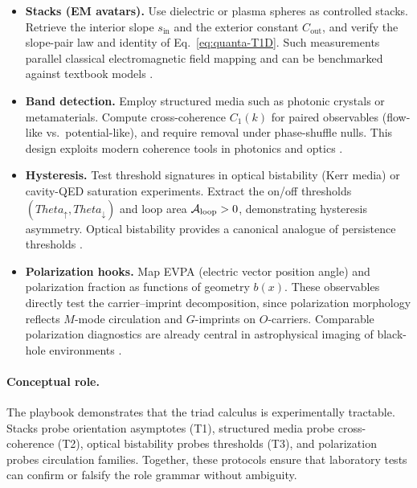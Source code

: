 \documentclass[12pt,a4paper,oneside]{scrreprt}
\def\Theta{Theta}%
\begin{document}
\begin{itemize}
  \item \textbf{Stacks (EM avatars).} 
  Use dielectric or plasma spheres as controlled stacks. 
  Retrieve the interior slope $s_{\mathrm{in}}$ and the exterior constant $C_{\mathrm{out}}$, 
  and verify the slope-pair law and identity of Eq.~\eqref{eq:quanta-T1D}. 
  Such measurements parallel classical electromagnetic field mapping 
  and can be benchmarked against textbook models \citep{Jackson1999Classical}.
  
  \item \textbf{Band detection.} 
  Employ structured media such as photonic crystals or metamaterials. 
  Compute cross-coherence $C_1(k)$ for paired observables 
  (flow-like vs.\ potential-like), and require removal under phase-shuffle nulls. 
  This design exploits modern coherence tools in photonics and optics 
  \citep{Mandel1995Optical}.
  
  \item \textbf{Hysteresis.} 
  Test threshold signatures in optical bistability (Kerr media) 
  or cavity-QED saturation experiments. 
  Extract the on/off thresholds 
  $(\Theta_\uparrow,\Theta_\downarrow)$ and loop area $\mathcal A_{\rm loop} > 0$, 
  demonstrating hysteresis asymmetry. 
  Optical bistability provides a canonical analogue of persistence thresholds 
  \citep{Gibbs1985Optical,Mabuchi2002CavityQED}.
  
  \item \textbf{Polarization hooks.} 
  Map EVPA (electric vector position angle) and polarization fraction as functions 
  of geometry $b(x)$. 
  These observables directly test the carrier–imprint decomposition, 
  since polarization morphology reflects $M$-mode circulation and $G$-imprints 
  on $O$-carriers. 
  Comparable polarization diagnostics are already central in astrophysical imaging 
  of black-hole environments \citep{EventHorizonTelescope2021Polarization}.
\end{itemize}

\paragraph{Conceptual role.} 
The playbook demonstrates that the triad calculus is experimentally tractable. 
Stacks probe orientation asymptotes (T1), structured media probe cross-coherence (T2), 
optical bistability probes thresholds (T3), and polarization probes circulation families. 
Together, these protocols ensure that laboratory tests can confirm or falsify the 
role grammar without ambiguity.
\end{document}
